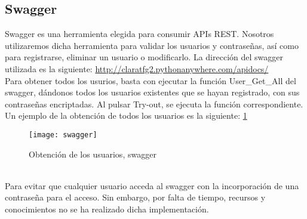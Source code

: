 \subsection{Swagger}
Swagger es una herramienta elegida para consumir APIs REST. Nosotros utilizaremos dicha herramienta para validar los usuarios y contraseñas, así como para registrarse, eliminar un usuario o modificarlo. 
La dirección del swagger utilizada es la siguiente:  \url{http://claratfg2.pythonanywhere.com/apidocs/}
\\Para obtener todos los usurios, basta con ejecutar la función User\_Get\_All del swagger, dándonos todos los usuarios existentes que se hayan registrado,  con sus contraseñas encriptadas. Al pulsar Try-out, se ejecuta la función correspondiente. Un ejemplo de la obtención de todos los usuarios es la siguiente: \ref{fig:D.1.6}
\begin{figure}[h]
\centering
\texttt{[image: swagger]}
\caption{Obtención de los usuarios, swagger}
\label{fig:D.1.6}
\end{figure}
\\Para evitar que cualquier usuario acceda al swagger con la incorporación de una contraseña para el acceso. Sin embargo, por falta de tiempo, recursos y conocimientos no se ha realizado dicha implementación. 
